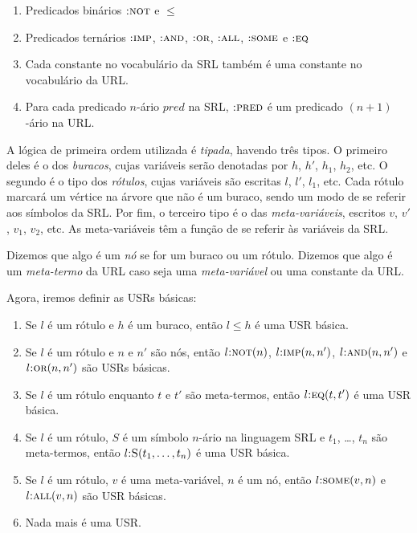 \begin{enumerate}
\item Predicados binários $\textsc{:not}$ e $\leq$
\item Predicados ternários $\textsc{:imp}$, $\textsc{:and}$, $\textsc{:or}$, $\textsc{:all}$, $\textsc{:some}$ e $\textsc{:eq}$
\item Cada constante no vocabulário da SRL também é uma constante no vocabulário da URL.
\item Para cada predicado $n$-ário $pred$ na SRL, $\textsc{:pred}$ é um predicado $(n+1)$-ário na URL.
\end{enumerate}

A lógica de primeira ordem utilizada é \textit{tipada}, havendo três tipos. O primeiro deles é o dos \textit{buracos}, cujas variáveis serão denotadas por $h$, $h'$, $h_1$, $h_2$, etc. O segundo é o tipo dos \textit{rótulos}, cujas variáveis são escritas $l$, $l'$, $l_1$, etc. Cada rótulo marcará um vértice na árvore que não é um buraco, sendo um modo de se referir aos símbolos da SRL. Por fim, o terceiro tipo é o das \textit{meta-variáveis}, escritos $v$, $v'$, $v_1$, $v_2$, etc. As meta-variáveis têm a função de se referir às variáveis da SRL.

Dizemos que algo é um \textit{nó} se for um buraco ou um rótulo. Dizemos que algo é um \textit{meta-termo} da URL caso seja uma \textit{meta-variável} ou uma constante da URL.

Agora, iremos definir as USRs básicas:

\begin{enumerate}
\item Se $l$ é um rótulo e $h$ é um buraco, então $l \leq h$ é uma USR básica. \label{dom-const}
\item Se $l$ é um rótulo e $n$ e $n'$ são nós, então $l\textsc{:not}(n)$, $l\textsc{:imp}(n,n')$, $l\textsc{:and}(n,n')$ e $l\textsc{:or}(n,n')$ são USRs básicas.
\item Se $l$ é um rótulo enquanto $t$ e $t'$ são meta-termos, então $l\textsc{:eq}(t,t')$ é uma USR básica.
\item Se $l$ é um rótulo, $S$ é um símbolo $n$-ário na linguagem SRL e $t_1$, \dots, $t_n$ são meta-termos, então $l\textsc{:S}(t_1,\dots, t_n)$ é uma USR básica.
\item Se $l$ é um rótulo, $v$ é uma meta-variável, $n$ é um nó,	então $l\textsc{:some}(v,n)$ e $l\textsc{:all}(v,n)$ são USR básicas.
\item Nada mais é uma USR.
\end{enumerate}

